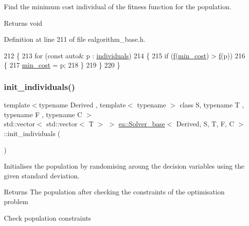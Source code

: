 Find the minimum cost individual of the fitness function for the population. 

\begin{DoxyReturn}{Returns}
void 
\end{DoxyReturn}


Definition at line 211 of file ealgorithm\+\_\+base.\+h.


\begin{DoxyCode}
212     \{
213         \textcolor{keywordflow}{for} (\textcolor{keyword}{const} \textcolor{keyword}{auto}& p : \hyperlink{classea_1_1_solver__base_ad75bc440d24a46e97694c7c889f2ecde}{individuals})
214         \{
215             \textcolor{keywordflow}{if} (\hyperlink{classea_1_1_solver__base_ae0a893780c93dfe17c1d17301de6494f}{f}(\hyperlink{classea_1_1_solver__base_af745cded954be26280d842c1e7c7f989}{min\_cost}) > \hyperlink{classea_1_1_solver__base_ae0a893780c93dfe17c1d17301de6494f}{f}(p))
216             \{
217                 \hyperlink{classea_1_1_solver__base_af745cded954be26280d842c1e7c7f989}{min\_cost} = p;
218             \}
219         \}
220     \}
\end{DoxyCode}
\mbox{\label{classea_1_1_solver__base_a3220df901d0e61d3c49e6265640d94ae}} 
\subsubsection{\texorpdfstring{init\+\_\+individuals()}{init\_individuals()}}
{\footnotesize\ttfamily template$<$typename Derived , template$<$ typename $>$ class S, typename T , typename F , typename C $>$ \\
std\+::vector$<$ std\+::vector$<$ T $>$ $>$ \hyperlink{classea_1_1_solver__base}{ea\+::\+Solver\+\_\+base}$<$ Derived, S, T, F, C $>$\+::init\+\_\+individuals (\begin{DoxyParamCaption}{ }\end{DoxyParamCaption})\hspace{0.3cm}{\ttfamily [protected]}}



Initialises the population by randomising aroung the decision variables using the given standard deviation. 

\begin{DoxyReturn}{Returns}
The population after checking the constraints of the optimisation problem 
\end{DoxyReturn}
Check population constraints 

